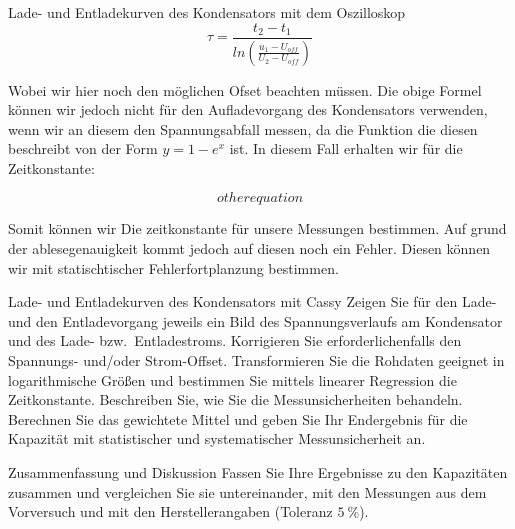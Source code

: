 \documentclass[twoside]{protokoll}
\begin{document}
\begin{aufgabe}{Lade- und Entladekurven des Kondensators mit dem Oszilloskop}
\begin{equation}
	\tau = \frac{t_2 - t_1}{ln\left(\frac{u_1-U_{off}}{U_2-U_{off}}\right)}	
\end{equation}

Wobei wir hier noch den möglichen Ofset beachten müssen. Die obige Formel können wir jedoch nicht für den Aufladevorgang des Kondensators verwenden, wenn wir an diesem den Spannungsabfall messen, da die Funktion die diesen beschreibt von der Form $ y = 1 - e^x $ ist. 
In diesem Fall erhalten wir für die Zeitkonstante:
 
 \begin{equation}
 other equation
\end{equation}

Somit können wir Die zeitkonstante für unsere Messungen bestimmen. Auf grund der ablesegenauigkeit kommt jedoch auf diesen noch ein Fehler. 
Diesen können wir mit statischtischer Fehlerfortplanzung bestimmen.


\end{aufgabe}

 
\begin{aufgabe}{Lade- und Entladekurven des Kondensators mit Cassy}
  Zeigen Sie für den Lade- und den Entladevorgang jeweils ein Bild des
  Spannungsverlaufs am Kondensator und des Lade- bzw.~Entladestroms.
  Korrigieren Sie erforderlichenfalls den Spannungs- und/oder
  Strom-Offset. Transformieren Sie die Rohdaten geeignet in
  logarithmische Größen und bestimmen Sie mittels linearer Regression
  die Zeitkonstante. Beschreiben Sie, wie Sie die Messunsicherheiten
  behandeln. Berechnen Sie das gewichtete Mittel und geben Sie Ihr
  Endergebnis für die Kapazität mit statistischer und systematischer
  Messunsicherheit an.
\end{aufgabe}


\begin{aufgabe}{Zusammenfassung und Diskussion}
  Fassen Sie Ihre Ergebnisse zu den Kapazitäten zusammen und
  vergleichen Sie sie untereinander, mit den Messungen aus dem
  Vorversuch und mit den Herstellerangaben (Toleranz
  $\SI{5}{\percent}$).  
\end{aufgabe}

 
 
 
\end{document}
